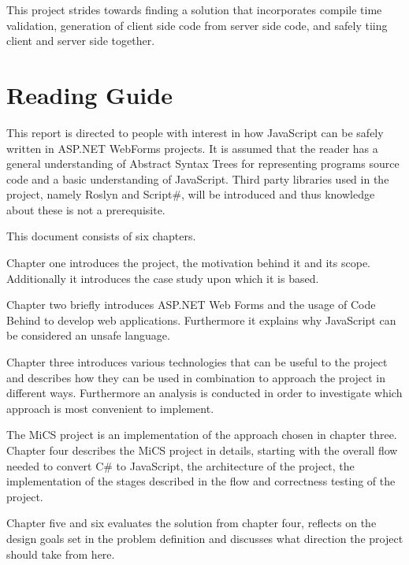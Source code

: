 	This project strides towards finding a solution that incorporates compile time validation, generation of client side code from server side code, and safely tiing client and server side together.

\section{Reading Guide}

	This report is directed to people with interest in how JavaScript can be safely written in ASP.NET WebForms projects. It is assumed that the reader has a general understanding of Abstract Syntax Trees for representing programs source code and a basic understanding of JavaScript. Third party libraries used in the project, namely Roslyn and Script\#, will be introduced and thus knowledge about these is not a prerequisite.

	This document consists of six chapters.

	Chapter one introduces the project, the motivation behind it and its scope. Additionally it introduces the case study upon which it is based.

	Chapter two briefly introduces ASP.NET Web Forms and the usage of Code Behind to develop web applications. Furthermore it explains why JavaScript can be considered an unsafe language.

	Chapter three introduces various technologies that can be useful to the project and describes how they can be used in combination to approach the project in different ways. Furthermore an analysis is conducted in order to investigate which approach is most convenient to implement.

	The MiCS project is an implementation of the approach chosen in chapter three. Chapter four describes the MiCS project in details, starting with the overall flow needed to convert C\# to JavaScript, the architecture of the project, the implementation of the stages described in the flow and correctness testing of the project.

	Chapter five and six evaluates the solution from chapter four, reflects on the design goals set in the problem definition and discusses what direction the project should take from here.

